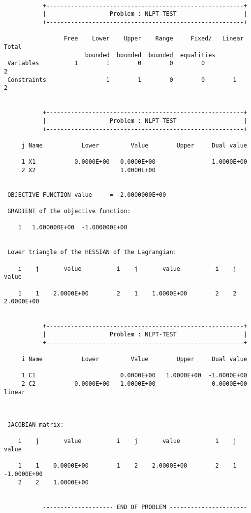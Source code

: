 \documentclass{galahad}
\begin{document}
{\small
\begin{verbatim}

           +--------------------------------------------------------+
           |                  Problem : NLPT-TEST                   |
           +--------------------------------------------------------+

                 Free    Lower    Upper    Range     Fixed/   Linear  Total
                       bounded  bounded  bounded  equalities
 Variables          1        1        0        0        0                 2
 Constraints                 1        1        0        0        1        2


           +--------------------------------------------------------+
           |                  Problem : NLPT-TEST                   |
           +--------------------------------------------------------+

     j Name           Lower         Value        Upper     Dual value

     1 X1           0.0000E+00   0.0000E+00                1.0000E+00
     2 X2                        1.0000E+00


 OBJECTIVE FUNCTION value     = -2.0000000E+00

 GRADIENT of the objective function:
  
    1   1.000000E+00  -1.000000E+00
  

 Lower triangle of the HESSIAN of the Lagrangian:
 
    i    j       value          i    j       value          i    j       value  
  
    1    1    2.0000E+00        2    1    1.0000E+00        2    2    2.0000E+00
 

           +--------------------------------------------------------+
           |                  Problem : NLPT-TEST                   |
           +--------------------------------------------------------+

     i Name           Lower         Value        Upper     Dual value

     1 C1                        0.0000E+00   1.0000E+00  -1.0000E+00           
     2 C2           0.0000E+00   1.0000E+00                0.0000E+00     linear



 JACOBIAN matrix:
 
    i    j       value          i    j       value          i    j       value  
  
    1    1    0.0000E+00        1    2    2.0000E+00        2    1   -1.0000E+00
    2    2    1.0000E+00
 

           -------------------- END OF PROBLEM ----------------------

\end{verbatim}
}
\end{document}
